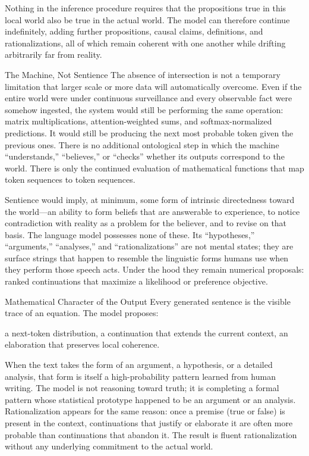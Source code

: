Nothing in the inference procedure requires that the propositions true in this local world also be true in the actual world. The model can therefore continue indefinitely, adding further propositions, causal claims, definitions, and rationalizations, all of which remain coherent with one another while drifting arbitrarily far from reality.

The Machine, Not Sentience
The absence of intersection is not a temporary limitation that larger scale or more data will automatically overcome. Even if the entire world were under continuous surveillance and every observable fact were somehow ingested, the system would still be performing the same operation: matrix multiplications, attention-weighted sums, and softmax-normalized predictions. It would still be producing the next most probable token given the previous ones. There is no additional ontological step in which the machine “understands,” “believes,” or “checks” whether its outputs correspond to the world. There is only the continued evaluation of mathematical functions that map token sequences to token sequences.

Sentience would imply, at minimum, some form of intrinsic directedness toward the world—an ability to form beliefs that are answerable to experience, to notice contradiction with reality as a problem for the believer, and to revise on that basis. The language model possesses none of these. Its “hypotheses,” “arguments,” “analyses,” and “rationalizations” are not mental states; they are surface strings that happen to resemble the linguistic forms humans use when they perform those speech acts. Under the hood they remain numerical proposals: ranked continuations that maximize a likelihood or preference objective.

Mathematical Character of the Output
Every generated sentence is the visible trace of an equation. The model proposes:

a next-token distribution,
a continuation that extends the current context,
an elaboration that preserves local coherence.

When the text takes the form of an argument, a hypothesis, or a detailed analysis, that form is itself a high-probability pattern learned from human writing. The model is not reasoning toward truth; it is completing a formal pattern whose statistical prototype happened to be an argument or an analysis. Rationalization appears for the same reason: once a premise (true or false) is present in the context, continuations that justify or elaborate it are often more probable than continuations that abandon it. The result is fluent rationalization without any underlying commitment to the actual world.

